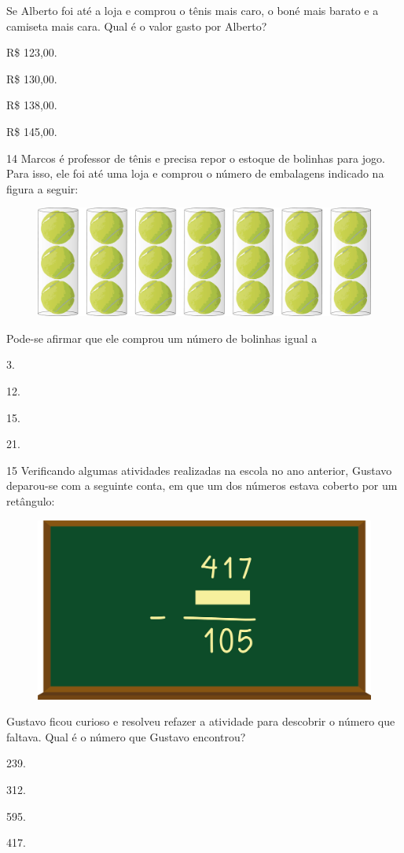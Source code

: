 Se Alberto foi até a loja e comprou o tênis mais caro, o boné mais barato e a camiseta mais cara. Qual é o valor gasto por Alberto?

\begin{escolha}
\item
  R\$ 123,00.
\item
  R\$ 130,00.
\item
  R\$ 138,00.
\item
  R\$ 145,00.
\end{escolha}


\pagebreak
\num{14} Marcos é professor de tênis e  precisa repor o estoque de bolinhas para jogo. Para isso, ele foi até uma loja e comprou o número de embalagens indicado na figura a seguir:

\begin{figure}[htpb!]
\centering
\includegraphics[width=.8\textwidth]{./media/image121.png}
\end{figure}

Pode-se afirmar que ele comprou um número de bolinhas igual a

\begin{multicols}{2}
\begin{escolha}
\item
  3.
\item
  12.
\item
  15.
\item
  21.
\end{escolha}
\end{multicols}


\num{15} Verificando algumas atividades realizadas na escola no ano anterior, Gustavo deparou-se com a seguinte conta, em que um dos números estava
coberto por um retângulo:

\begin{figure}[htpb!]
\centering  
\includegraphics[width=.5\textwidth]{./media/image122.png}
\end{figure}

Gustavo ficou curioso e resolveu refazer a atividade para descobrir o número que faltava. Qual é o número que Gustavo encontrou?

\begin{multicols}{2}
\begin{escolha}
\item
  239.
\item
  312.
\item
  595.
\item
  417.
\end{escolha}
\end{multicols}




